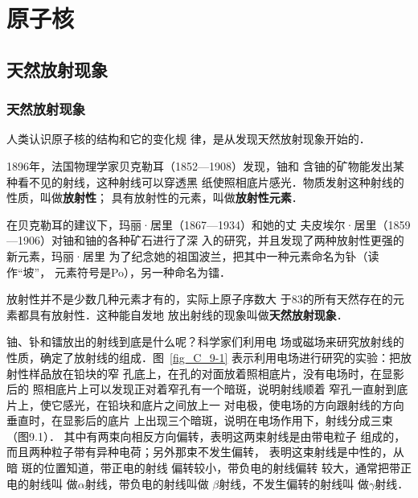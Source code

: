 \chapter{原子核}\label{chapter-atomic-nucleus}

\section{天然放射现象}

\subsection{天然放射现象}

人类认识原子核的结构和它的变化规
律，是从发现天然放射现象开始的．

1896年，法国物理学家贝克勒耳（1852—1908）发现，铀和
含铀的矿物能发出某种看不见的射线，这种射线可以穿透黑
纸使照相底片感光．物质发射这种射线的性质，叫做\textbf{放射性}；
具有放射性的元素，叫做\textbf{放射性元素}．

在贝克勒耳的建议下，玛丽·居里（1867—1934）和她的丈
夫皮埃尔·居里（1859—1906）对铀和铀的各种矿石进行了深
入的研究，并且发现了两种放射性更强的新元素，玛丽·居里
为了纪念她的祖国波兰，把其中一种元素命名为钋（读作“坡”，
元素符号是Po），另一种命名为镭．

放射性并不是少数几种元素才有的，实际上原子序数大
于83的所有天然存在的元素都具有放射性．这种能自发地
放出射线的现象叫做\textbf{天然放射现象}．

铀、钋和镭放出的射线到底是什么呢？科学家们利用电
场或磁场来研究放射线的性质，确定了放射线的组成．图~\ref{fig_C_9-1} 
表示利用电场进行研究的实验：把放射性样品放在铅块的窄
孔底上，在孔的对面放着照相底片，没有电场时，在显影后的
照相底片上可以发现正对着窄孔有一个暗斑，说明射线顺着
窄孔一直射到底片上，使它感光，在铅块和底片之间放上一
对电极，使电场的方向跟射线的方向垂直时，在显影后的底片
上出现三个暗斑，说明在电场作用下，射线分成三束（图9.1）．
其中有两束向相反方向偏转，表明这两束射线是由带电粒子
组成的，而且两种粒子带有异种电荷；另外那束不发生偏转，
表明这束射线是中性的，从暗
斑的位置知道，带正电的射线
偏转较小，带负电的射线偏转
较大，通常把带正电的射线叫
做$\alpha$射线，带负电的射线叫做
$\beta$射线，不发生偏转的射线叫
做$\gamma$射线．

